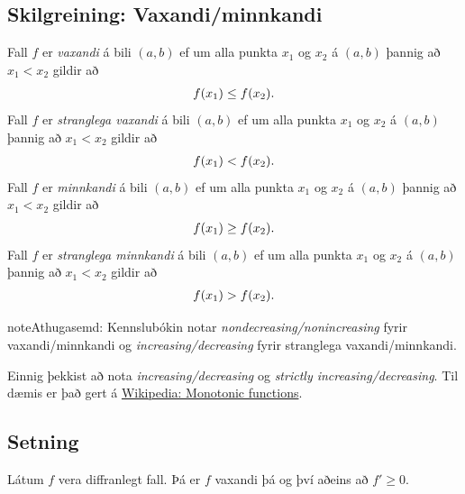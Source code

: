 \documentclass[a4paper,10pt,icelandic]{sphinxmanual}
\begin{document}
\subsection{Skilgreining: Vaxandi/minnkandi}
\label{kafli03:index-9}\label{kafli03:skilgreining-vaxandi-minnkandi}
Fall \(f\) er \emph{vaxandi} á bili \((a,b)\) ef um
alla punkta \(x_1\) og \(x_2\) á \((a,b)\) þannig að
\(x_1 < x_2\) gildir að
\begin{gather}
\begin{split}f(x_1) \leq f(x_2).\end{split}\notag
\end{gather}
Fall \(f\) er \emph{stranglega vaxandi} á bili \((a,b)\)
ef um alla punkta \(x_1\) og \(x_2\) á \((a,b)\) þannig að
\(x_1 < x_2\) gildir að
\begin{gather}
\begin{split}f(x_1) < f(x_2).\end{split}\notag
\end{gather}
Fall \(f\) er \emph{minnkandi} á bili \((a,b)\) ef um
alla punkta \(x_1\) og \(x_2\) á \((a,b)\) þannig að
\(x_1 < x_2\) gildir að
\begin{gather}
\begin{split}f(x_1) \geq f(x_2).\end{split}\notag
\end{gather}
Fall \(f\) er \emph{stranglega minnkandi} á bili
\((a,b)\) ef um alla punkta \(x_1\) og \(x_2\) á
\((a,b)\) þannig að \(x_1 < x_2\) gildir að
\begin{gather}
\begin{split}f(x_1) > f(x_2).\end{split}\notag
\end{gather}
\begin{notice}{note}{Athugasemd:}
Kennslubókin notar \emph{nondecreasing/nonincreasing} fyrir vaxandi/minnkandi og
\emph{increasing/decreasing} fyrir stranglega vaxandi/minnkandi.

Einnig þekkist að nota \emph{increasing/decreasing} og \emph{strictly increasing/decreasing}.
Til dæmis er það gert á \href{https://en.wikipedia.org/wiki/Monotonic\_function}{Wikipedia: Monotonic functions}.
\end{notice}


\subsection{Setning}
\label{kafli03:vaxandieoae}\label{kafli03:id15}
Látum \(f\) vera diffranlegt fall. Þá er \(f\) vaxandi þá og því
aðeins að \(f' \geq 0\).
\end{document}
